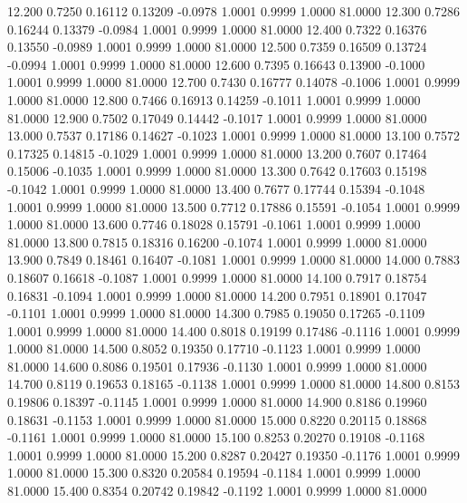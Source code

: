   12.200   0.7250   0.16112   0.13209  -0.0978   1.0001   0.9999   1.0000  81.0000
  12.300   0.7286   0.16244   0.13379  -0.0984   1.0001   0.9999   1.0000  81.0000
  12.400   0.7322   0.16376   0.13550  -0.0989   1.0001   0.9999   1.0000  81.0000
  12.500   0.7359   0.16509   0.13724  -0.0994   1.0001   0.9999   1.0000  81.0000
  12.600   0.7395   0.16643   0.13900  -0.1000   1.0001   0.9999   1.0000  81.0000
  12.700   0.7430   0.16777   0.14078  -0.1006   1.0001   0.9999   1.0000  81.0000
  12.800   0.7466   0.16913   0.14259  -0.1011   1.0001   0.9999   1.0000  81.0000
  12.900   0.7502   0.17049   0.14442  -0.1017   1.0001   0.9999   1.0000  81.0000
  13.000   0.7537   0.17186   0.14627  -0.1023   1.0001   0.9999   1.0000  81.0000
  13.100   0.7572   0.17325   0.14815  -0.1029   1.0001   0.9999   1.0000  81.0000
  13.200   0.7607   0.17464   0.15006  -0.1035   1.0001   0.9999   1.0000  81.0000
  13.300   0.7642   0.17603   0.15198  -0.1042   1.0001   0.9999   1.0000  81.0000
  13.400   0.7677   0.17744   0.15394  -0.1048   1.0001   0.9999   1.0000  81.0000
  13.500   0.7712   0.17886   0.15591  -0.1054   1.0001   0.9999   1.0000  81.0000
  13.600   0.7746   0.18028   0.15791  -0.1061   1.0001   0.9999   1.0000  81.0000
  13.800   0.7815   0.18316   0.16200  -0.1074   1.0001   0.9999   1.0000  81.0000
  13.900   0.7849   0.18461   0.16407  -0.1081   1.0001   0.9999   1.0000  81.0000
  14.000   0.7883   0.18607   0.16618  -0.1087   1.0001   0.9999   1.0000  81.0000
  14.100   0.7917   0.18754   0.16831  -0.1094   1.0001   0.9999   1.0000  81.0000
  14.200   0.7951   0.18901   0.17047  -0.1101   1.0001   0.9999   1.0000  81.0000
  14.300   0.7985   0.19050   0.17265  -0.1109   1.0001   0.9999   1.0000  81.0000
  14.400   0.8018   0.19199   0.17486  -0.1116   1.0001   0.9999   1.0000  81.0000
  14.500   0.8052   0.19350   0.17710  -0.1123   1.0001   0.9999   1.0000  81.0000
  14.600   0.8086   0.19501   0.17936  -0.1130   1.0001   0.9999   1.0000  81.0000
  14.700   0.8119   0.19653   0.18165  -0.1138   1.0001   0.9999   1.0000  81.0000
  14.800   0.8153   0.19806   0.18397  -0.1145   1.0001   0.9999   1.0000  81.0000
  14.900   0.8186   0.19960   0.18631  -0.1153   1.0001   0.9999   1.0000  81.0000
  15.000   0.8220   0.20115   0.18868  -0.1161   1.0001   0.9999   1.0000  81.0000
  15.100   0.8253   0.20270   0.19108  -0.1168   1.0001   0.9999   1.0000  81.0000
  15.200   0.8287   0.20427   0.19350  -0.1176   1.0001   0.9999   1.0000  81.0000
  15.300   0.8320   0.20584   0.19594  -0.1184   1.0001   0.9999   1.0000  81.0000
  15.400   0.8354   0.20742   0.19842  -0.1192   1.0001   0.9999   1.0000  81.0000
